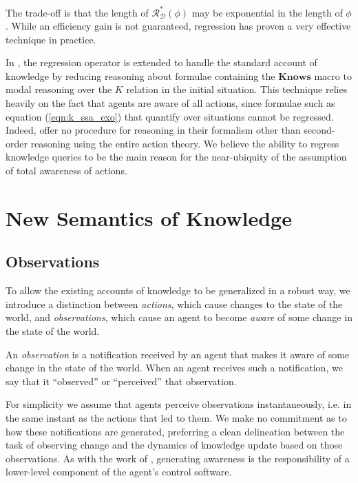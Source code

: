 \documentclass{ifaamas-submission}
\begin{document}
The trade-off is that the length of $\mathcal{R}_{\mathcal{D}}^{*}(\phi)$
may be exponential in the length of $\phi$. While an efficiency gain
is not guaranteed, regression has proven a very effective technique
in practice.

In \cite{scherl03sc_knowledge}, the regression operator is extended
to handle the standard account of knowledge by reducing reasoning
about formulae containing the $\mathbf{Knows}$ macro to modal reasoning
over the $K$ relation in the initial situation. This technique relies
heavily on the fact that agents are aware of all actions, since formulae
such as equation (\ref{eqn:k_ssa_exo}) that quantify over situations
cannot be regressed. Indeed, \cite{Lesperance99sitcalc_approach}
offer no procedure for reasoning in their formalism other than second-order
reasoning using the entire action theory. We believe the ability to
regress knowledge queries to be the main reason for the near-ubiquity
of the assumption of total awareness of actions.


\section{New Semantics of Knowledge}

\label{sec:New-Semantics}


\subsection{Observations}

To allow the existing accounts of knowledge to be generalized in a robust way,
we introduce
a distinction between \emph{actions}, which cause changes to the state
of the world, and \emph{observations}, which cause an agent to become
\emph{aware} of some change in the state of the world.

\begin{definition}%
An \emph{observation} is a notification received by an agent that
makes it aware of some change in the state of the world. When an agent
receives such a notification, we say that it {}``observed'' or {}``perceived''
that observation.
\end{definition}%
For simplicity we assume that agents perceive observations instantaneously,
i.e. in the same instant as the actions that led to them. We make
no commitment as to how these notifications are generated, preferring
a clean delineation between the task of observing change and the dynamics
of knowledge update based on those observations. As with the work
of \cite{scherl03sc_knowledge}, generating awareness is the responsibility
of a lower-level component of the agent's control software.
\end{document}

